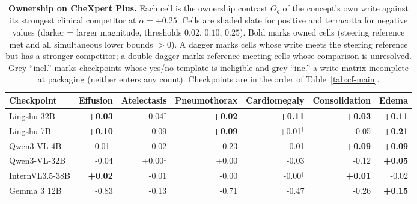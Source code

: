 \begin{table}[h]
\centering
\scriptsize
\setlength{\tabcolsep}{4pt}
\renewcommand{\arraystretch}{1.08}

\caption{\textbf{Ownership on CheXpert Plus.} Each cell is the ownership contrast $O_q$ of the concept's own write against its strongest clinical competitor at $\alpha=+0.25$. Cells are shaded slate for positive and terracotta for negative values (darker = larger magnitude, thresholds $0.02$, $0.10$, $0.25$). Bold marks owned cells (steering reference met and all simultaneous lower bounds $>0$). A dagger marks cells whose write meets the steering reference but has a stronger competitor; a double dagger marks reference-meeting cells whose comparison is unresolved. Grey ``inel.'' marks checkpoints whose yes/no template is ineligible and grey ``inc.'' a write matrix incomplete at packaging (neither enters any count). Checkpoints are in the order of Table~\ref{tab:cf-main}.}
\label{tab:cf-own-chexpert}
\begin{tabular}{lrrrrrr}
\toprule
Checkpoint & Effusion & Atelectasis & Pneumothorax & Cardiomegaly & Consolidation & Edema \\
\midrule
Lingshu 32B & \cellcolor{cfSlate2}\textbf{+0.03} & \cellcolor{cfTerra2}-0.04$^{\dagger}$ & \cellcolor{cfSlate2}\textbf{+0.02} & \cellcolor{cfSlate3}\textbf{+0.11} & \cellcolor{cfSlate2}\textbf{+0.03} & \cellcolor{cfSlate3}\textbf{+0.11} \\
Lingshu 7B & \cellcolor{cfSlate2}\textbf{+0.10} & \cellcolor{cfTerra2}-0.09 & \cellcolor{cfSlate2}\textbf{+0.09} & \cellcolor{cfSlate1}+0.01$^{\ddagger}$ & \cellcolor{cfTerra2}-0.05 & \cellcolor{cfSlate3}\textbf{+0.21} \\
Qwen3-VL-4B & \cellcolor{cfTerra1}-0.01$^{\dagger}$ & \cellcolor{cfTerra1}-0.02 & \cellcolor{cfTerra3}-0.23 & \cellcolor{cfTerra1}-0.01 & \cellcolor{cfSlate2}\textbf{+0.09} & \cellcolor{cfSlate2}\textbf{+0.09} \\
Qwen3-VL-32B & \cellcolor{cfTerra2}-0.04 & \cellcolor{cfSlate1}+0.00$^{\ddagger}$ & \cellcolor{cfSlate1}+0.00 & \cellcolor{cfTerra2}-0.03 & \cellcolor{cfTerra3}-0.12 & \cellcolor{cfSlate2}\textbf{+0.05} \\
InternVL3.5-38B & \cellcolor{cfSlate1}\textbf{+0.02} & \cellcolor{cfTerra1}-0.01 & \cellcolor{cfTerra1}-0.00 & \cellcolor{cfTerra1}-0.00$^{\ddagger}$ & \cellcolor{cfSlate1}\textbf{+0.01} & \cellcolor{cfTerra2}-0.02 \\
Gemma 3 12B & \cellcolor{cfTerra4}-0.83 & \cellcolor{cfTerra3}-0.13 & \cellcolor{cfTerra4}-0.71 & \cellcolor{cfTerra4}-0.47 & \cellcolor{cfTerra4}-0.26 & \cellcolor{cfSlate3}\textbf{+0.15} \\

\end{tabular}
\end{table}
